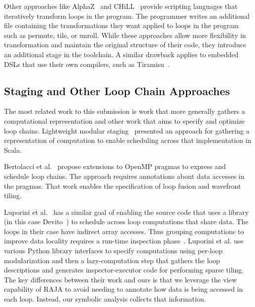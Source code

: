 Other approaches like AlphaZ~\cite{yuki2012alphaz} and CHiLL~\cite{tiwari2009scalable} provide scripting languages that iteratively transform loops in the program. 
The programmer writes an additional file containing the transformations they want applied to loops in the program such as permute, tile, or unroll. 
While these approaches allow more flexibility in transformation and maintain the original structure of their code, they introduce an additional stage in the toolchain.
A similar drawback applies to embedded DSLs that use their own compilers, such as Tiramisu~\cite{baghdadi2019tiramisu}.




\subsection{Staging and Other Loop Chain Approaches}

The most related work to this submission is work that more generally gathers
a computational representation and other work that aims to specify and
optimize loop chains.
Lightweight modular staging~\cite{LMS2012} presented an approach for gathering 
a representation of computation to enable scheduling across that implementation
in Scala.

Bertolacci et al.~\cite{Bertolacci2016,Bertolacci2019} propose extensions to
OpenMP pragmas to express and schedule loop chains.
The approach requires annotations about data accesses in the pragmas.
That work enables the specification of loop fusion and wavefront tiling. 

Luporini et al.~\cite{Luporini2019} has a similar goal of enabling the source
code that uses a library  (in this case Devito~\cite{Luporini2018}) to
schedule across loop computations that share data.
The loops in their case have indirect array accesses.
Thus grouping computations to improve data locality requires a run-time
inspection phase~\cite{Strout14IPDPS}.
Luporini et al. use various Python library interfaces to specify computations
using per-loop modularization and then a lazy-computation step that gathers
the loop descriptions and generates inspector-executor code for performing 
sparse tiling.
The key differences between their work and ours is that we leverage the view 
capability of RAJA to avoid needing to annotate how data is being accessed
in each loop.  
Instead, our symbolic analysis collects that information.

